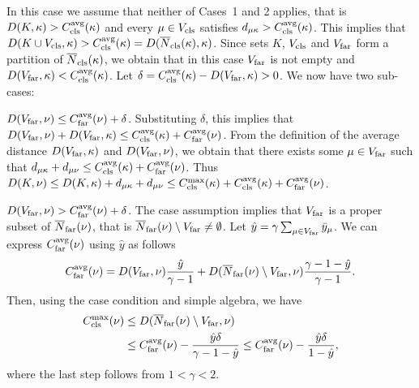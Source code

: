 \documentclass[oneside,final]{ucr}
\begin{document}
\medskip
\noindent
{} In this case we assume that neither of Cases~1 and 2 applies, that is
 $D(K, \kappa) > \clsdist(\kappa)$ and every $\mu \in V_{\cls}$ satisfies
 $d_{\mu\kappa} >  \clsdist(\kappa)$. This implies that
$D(K\cup V_{\cls}, \kappa) > \clsdist(\kappa) = D(\wbarclsnb(\kappa), \kappa)$.
Since sets $K$, $V_{\cls}$ and $V_{\far}$ form a partition of $\wbarclsnb(\kappa)$,
we obtain that in this case $V_{\far}$ is not
empty and $D(V_{\far}, \kappa) < \clsdist(\kappa)$. 
Let $\delta = \clsdist(\kappa) - D(V_{\far}, \kappa) > 0$. 
We now have two sub-cases:
%
\begin{description}
	
\item{} {$D(V_{\far}, \nu) \leq \fardist(\nu) + \delta$}.
  Substituting $\delta$, this implies that $D(V_{\far}, \nu) +
  D(V_{\far},\kappa) \le \clsdist(\kappa) + \fardist(\nu)$.  From the
  definition of the average distance $D(V_{\far},\kappa)$ and
  $D(V_{\far}, \nu)$, we obtain that there exists some $\mu \in
  V_{\far}$ such that $d_{\mu\kappa} + d_{\mu\nu} \leq
  \clsdist(\kappa) + \fardist(\nu)$.  Thus $D(K, \nu) \leq D(K,
  \kappa) + d_{\mu\kappa} + d_{\mu\nu} \leq \clsmax(\kappa) +
  \clsdist(\kappa) + \fardist(\nu)$.

\item{} {$D(V_{\far}, \nu) > \fardist(\nu) + \delta$}.
  The case assumption implies that $V_{\far}$ is a proper subset of
  $\wbarfarnb(\nu)$, that is $\wbarfarnb(\nu) \setminus V_{\far}
  \neq\emptyset$.  Let $\hat{y} = \gamma \sum_{\mu\in V_{\smallfar}}
  \bary_{\mu}$.  We can express $\fardist(\nu)$ using $\hat{y}$ as
  follows
%
\begin{equation*}
\fardist(\nu) = D(V_{\far},\nu) \frac{\hat{y}}{\gamma-1} +
    D(\wbarfarnb(\nu)\setminus V_{\far}, \nu) \frac{\gamma-1-\hat{y}}{\gamma-1}.
\end{equation*}
%
Then, using the case condition and simple algebra, we have
%
  \begin{align}
    \clsmax(\nu) &\leq D(\wbarfarnb(\nu) \setminus V_{\far}, \nu) 
			\notag
		\\
		&\leq \fardist(\nu) - \frac{\hat{y}\delta}{\gamma-1-\hat{y}} 
		\leq \fardist(\nu) - \frac{\hat{y}\delta}{1-\hat{y}},
			\label{eqn: case 3, bound on C_cls^max(nu)}
  \end{align}
%
where the last step follows from $1 < \gamma < 2$. 


\end{description}
\end{document}
